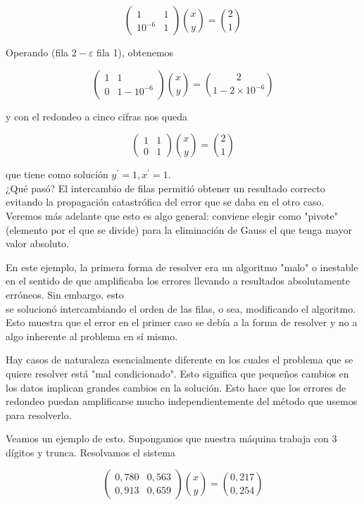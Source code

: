 \documentclass[10pt]{article}
\begin{document}
$$
\left(\begin{array}{cc}
1 & 1 \\
10^{-6} & 1
\end{array}\right)\binom{x}{y}=\binom{2}{1}
$$

Operando (fila $2-\varepsilon$ fila 1), obtenemos

$$
\left(\begin{array}{cc}
1 & 1 \\
0 & 1-10^{-6}
\end{array}\right)\binom{x}{y}=\binom{2}{1-2 \times 10^{-6}}
$$

y con el redondeo a cinco cifras nos queda

$$
\left(\begin{array}{ll}
1 & 1 \\
0 & 1
\end{array}\right)\binom{x}{y}=\binom{2}{1}
$$

que tiene como solución $y^{\prime}=1, x^{\prime}=1$.\\
¿Qué pasó? El intercambio de filas permitió obtener un resultado correcto evitando la propagación catastrófica del error que se daba en el otro caso. Veremos más adelante que esto es algo general: conviene elegir como "pivote" (elemento por el que se divide) para la eliminación de Gauss el que tenga mayor valor absoluto.

En este ejemplo, la primera forma de resolver era un algoritmo "malo" o inestable en el sentido de que amplificaba los errores llevando a resultados absolutamente erróneos. Sin embargo, esto\\
se solucionó intercambiando el orden de las filas, o sea, modificando el algoritmo. Esto muestra que el error en el primer caso se debía a la forma de resolver y no a algo inherente al problema en sí mismo.

Hay casos de naturaleza esencialmente diferente en los cuales el problema que se quiere resolver está "mal condicionado". Esto significa que pequeños cambios en los datos implican grandes cambios en la solución. Esto hace que los errores de redondeo puedan amplificarse mucho independientemente del método que usemos para resolverlo.

Veamos un ejemplo de esto. Supongamos que nuestra máquina trabaja con 3 dígitos y trunca. Resolvamos el sistema

$$
\left(\begin{array}{ll}
0,780 & 0,563 \\
0,913 & 0,659
\end{array}\right)\binom{x}{y}=\binom{0,217}{0,254}
$$
\end{document}
